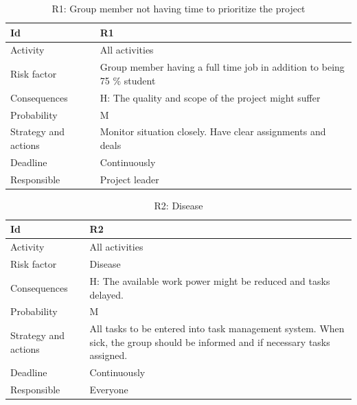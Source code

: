 \documentclass[11pt]{book}
\begin{document}
\begin{table}[H]
\centering
\begin{tabular}{ l  p{11cm} }
    Id                      & R1                                                                          \\ \hline
    Activity                & All activities                                                              \\ \hline
    Risk factor             & Group member having a full time job in addition to being 75 \% student      \\ \hline
    Consequences            & H: The quality and scope of the project might suffer                        \\ \hline
    Probability             & M                                                                           \\ \hline
    Strategy and actions    & Monitor situation closely. Have clear assignments and deals                 \\ \hline
    Deadline                & Continuously                                                                \\ \hline
    Responsible             & Project leader                                                              \\ 
\end{tabular}
\label{tab:risk_1}
\caption{R1: Group member not having time to prioritize the project}
\end{table}

\begin{table}[H]
\centering
\begin{tabular}{ l  p{11cm} }
    Id                      & R2                                                                          \\ \hline
    Activity                & All activities                                                              \\ \hline
    Risk factor             & Disease                                                                     \\ \hline
    Consequences            & H: The available work power might be reduced and tasks delayed.             \\ \hline
    Probability             & M                                                                           \\ \hline
    Strategy and actions    & All tasks to be entered into task management system. 
                              When sick, the group should be informed and if necessary tasks assigned.    \\ \hline
    Deadline                & Continuously                                                                \\ \hline
    Responsible             & Everyone\\
\end{tabular}
\label{tab:risk_2}
\caption{R2: Disease}
\end{table}
\end{document}
